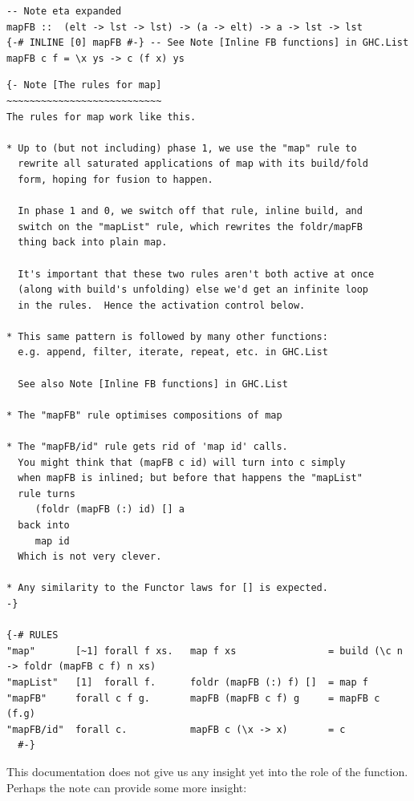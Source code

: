 \begin{listing}[H]
\begin{verbatim}
-- Note eta expanded
mapFB ::  (elt -> lst -> lst) -> (a -> elt) -> a -> lst -> lst
{-# INLINE [0] mapFB #-} -- See Note [Inline FB functions] in GHC.List
mapFB c f = \x ys -> c (f x) ys
\end{verbatim}
\end{listing}

\begin{listing}[H]
\begin{verbatim}
{- Note [The rules for map]
~~~~~~~~~~~~~~~~~~~~~~~~~~~
The rules for map work like this.

* Up to (but not including) phase 1, we use the "map" rule to
  rewrite all saturated applications of map with its build/fold
  form, hoping for fusion to happen.

  In phase 1 and 0, we switch off that rule, inline build, and
  switch on the "mapList" rule, which rewrites the foldr/mapFB
  thing back into plain map.

  It's important that these two rules aren't both active at once
  (along with build's unfolding) else we'd get an infinite loop
  in the rules.  Hence the activation control below.

* This same pattern is followed by many other functions:
  e.g. append, filter, iterate, repeat, etc. in GHC.List

  See also Note [Inline FB functions] in GHC.List

* The "mapFB" rule optimises compositions of map

* The "mapFB/id" rule gets rid of 'map id' calls.
  You might think that (mapFB c id) will turn into c simply
  when mapFB is inlined; but before that happens the "mapList"
  rule turns
     (foldr (mapFB (:) id) [] a
  back into
     map id
  Which is not very clever.

* Any similarity to the Functor laws for [] is expected.
-}

{-# RULES
"map"       [~1] forall f xs.   map f xs                = build (\c n -> foldr (mapFB c f) n xs)
"mapList"   [1]  forall f.      foldr (mapFB (:) f) []  = map f
"mapFB"     forall c f g.       mapFB (mapFB c f) g     = mapFB c (f.g)
"mapFB/id"  forall c.           mapFB c (\x -> x)       = c
  #-}
\end{verbatim}
\end{listing}

This documentation does not give us any insight yet into the role of the  function. Perhaps the note  can provide
some more insight:

